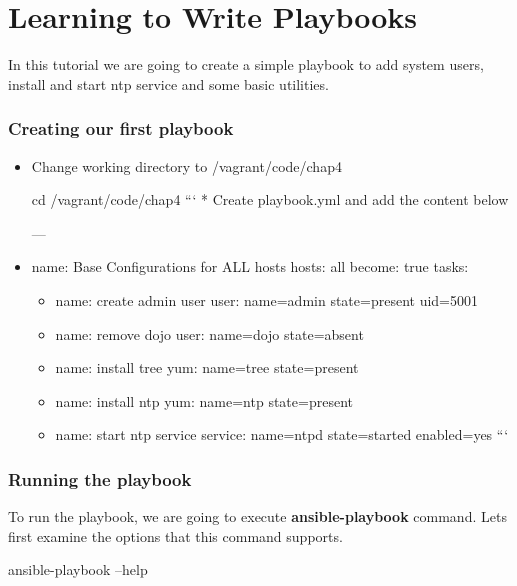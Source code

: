 \chapter{Learning to Write Playbooks}

In this tutorial we are going to create a simple playbook to add system users, install and start ntp service and some basic utilities.

\subsection{Creating our first playbook}

\begin{itemize}
\item Change working directory to /vagrant/code/chap4\newline
\begin{code}
     cd /vagrant/code/chap4
```  
  * Create playbook.yml and add the content below

\end{code}
---
\item name: Base Configurations for ALL hosts
hosts: all
become: true
tasks:


\begin{itemize}
\item name: create admin user
user: name=admin state=present uid=5001
\item name: remove dojo
user: name=dojo  state=absent
\item name: install tree
yum:  name=tree  state=present
\item name: install ntp
yum:  name=ntp   state=present
\item name: start ntp service
service: name=ntpd state=started enabled=yes
```
\end{itemize}
\end{itemize}

\subsection{Running the  playbook}

To run the playbook, we are going to execute \textbf{ansible-playbook} command. Lets first examine the options that this command supports.

\begin{code}
ansible-playbook --help

\end{code}

